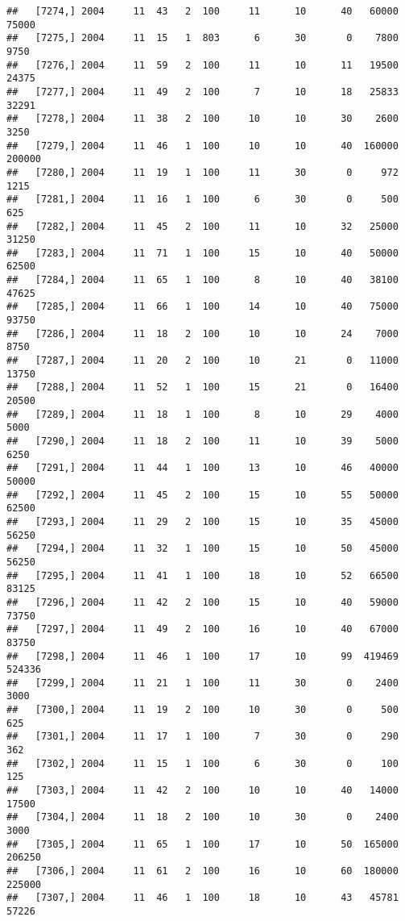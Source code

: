 \documentclass{article}\usepackage[]{graphicx}\usepackage[]{color}
\makeatletter
\newenvironment{kframe}{%
 \def\at@end@of@kframe{}%
 \ifinner\ifhmode%
  \def\at@end@of@kframe{\end{minipage}}%
  \begin{minipage}{\columnwidth}%
 \fi\fi%
 \def\FrameCommand##1{\hskip\@totalleftmargin \hskip-\fboxsep
 \colorbox{shadecolor}{##1}\hskip-\fboxsep
     \hskip-\linewidth \hskip-\@totalleftmargin \hskip\columnwidth}%
 \MakeFramed {\advance\hsize-\width
   \@totalleftmargin\z@ \linewidth\hsize
   \@setminipage}}%
 {\par\unskip\endMakeFramed%
 \at@end@of@kframe}
\newenvironment{knitrout}{}{} %
\makeatother
\begin{document}
\begin{knitrout}
\begin{kframe}
\begin{verbatim}
##   [7274,] 2004     11  43   2  100     11      10      40   60000   75000
##   [7275,] 2004     11  15   1  803      6      30       0    7800    9750
##   [7276,] 2004     11  59   2  100     11      10      11   19500   24375
##   [7277,] 2004     11  49   2  100      7      10      18   25833   32291
##   [7278,] 2004     11  38   2  100     10      10      30    2600    3250
##   [7279,] 2004     11  46   1  100     10      10      40  160000  200000
##   [7280,] 2004     11  19   1  100     11      30       0     972    1215
##   [7281,] 2004     11  16   1  100      6      30       0     500     625
##   [7282,] 2004     11  45   2  100     11      10      32   25000   31250
##   [7283,] 2004     11  71   1  100     15      10      40   50000   62500
##   [7284,] 2004     11  65   1  100      8      10      40   38100   47625
##   [7285,] 2004     11  66   1  100     14      10      40   75000   93750
##   [7286,] 2004     11  18   2  100     10      10      24    7000    8750
##   [7287,] 2004     11  20   2  100     10      21       0   11000   13750
##   [7288,] 2004     11  52   1  100     15      21       0   16400   20500
##   [7289,] 2004     11  18   1  100      8      10      29    4000    5000
##   [7290,] 2004     11  18   2  100     11      10      39    5000    6250
##   [7291,] 2004     11  44   1  100     13      10      46   40000   50000
##   [7292,] 2004     11  45   2  100     15      10      55   50000   62500
##   [7293,] 2004     11  29   2  100     15      10      35   45000   56250
##   [7294,] 2004     11  32   1  100     15      10      50   45000   56250
##   [7295,] 2004     11  41   1  100     18      10      52   66500   83125
##   [7296,] 2004     11  42   2  100     15      10      40   59000   73750
##   [7297,] 2004     11  49   2  100     16      10      40   67000   83750
##   [7298,] 2004     11  46   1  100     17      10      99  419469  524336
##   [7299,] 2004     11  21   1  100     11      30       0    2400    3000
##   [7300,] 2004     11  19   2  100     10      30       0     500     625
##   [7301,] 2004     11  17   1  100      7      30       0     290     362
##   [7302,] 2004     11  15   1  100      6      30       0     100     125
##   [7303,] 2004     11  42   2  100     10      10      40   14000   17500
##   [7304,] 2004     11  18   2  100     10      30       0    2400    3000
##   [7305,] 2004     11  65   1  100     17      10      50  165000  206250
##   [7306,] 2004     11  61   2  100     16      10      60  180000  225000
##   [7307,] 2004     11  46   1  100     18      10      43   45781   57226

\end{verbatim}
\end{kframe}
\end{knitrout}
\end{document}
